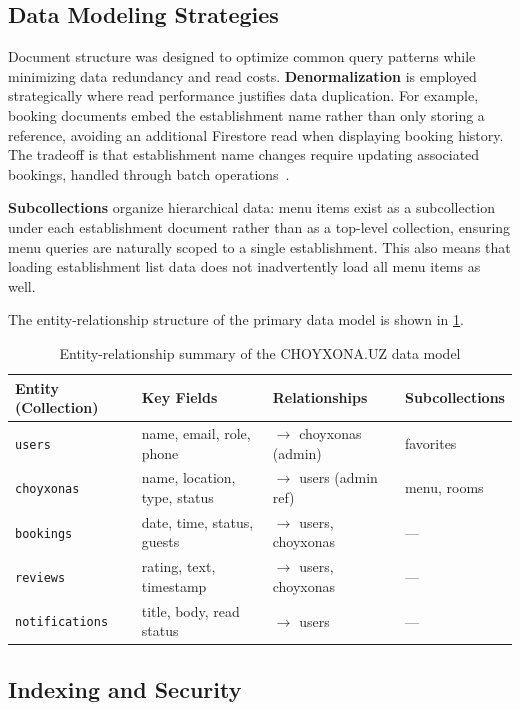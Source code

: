 \subsection{Data Modeling Strategies}
\label{subsec:data-modeling}

Document structure was designed to optimize common query patterns while minimizing data redundancy and read costs.
\textbf{Denormalization} is employed strategically where read performance justifies data duplication.
For example, booking documents embed the establishment name rather than only storing a reference, avoiding an additional Firestore read when displaying booking history.
The tradeoff is that establishment name changes require updating associated bookings, handled through batch operations~\cite{firebase_firestore2024}.

\textbf{Subcollections} organize hierarchical data: menu items exist as a subcollection under each establishment document rather than as a top-level collection, ensuring menu queries are naturally scoped to a single establishment.
This also means that loading establishment list data does not inadvertently load all menu items as well.

The entity-relationship structure of the primary data model is shown in \cref{tab:er-model}.

\begin{table}[htbp]
\caption{Entity-relationship summary of the CHOYXONA.UZ data model}
\label{tab:er-model}
\centering
\small
\begin{tabular}{llll}
\toprule
\textbf{Entity (Collection)} & \textbf{Key Fields} & \textbf{Relationships} & \textbf{Subcollections} \\
\midrule
\texttt{users}      & name, email, role, phone & $\to$ choyxonas (admin) & favorites \\
\texttt{choyxonas}  & name, location, type, status & $\to$ users (admin ref) & menu, rooms \\
\texttt{bookings}   & date, time, status, guests & $\to$ users, choyxonas & --- \\
\texttt{reviews}    & rating, text, timestamp & $\to$ users, choyxonas & --- \\
\texttt{notifications} & title, body, read status & $\to$ users & --- \\
\bottomrule
\end{tabular}
\end{table}


\subsection{Indexing and Security}
\label{subsec:indexing-security}

